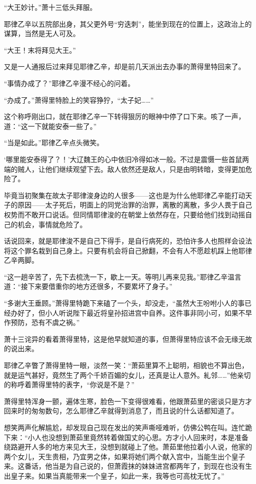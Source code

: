 “大王妙计。”萧十三低头拜服。

耶律乙辛以五院部出身，其父更外号“穷迭刺”，能坐到现在的位置上，这政治上的谋算，当然是无人可及。

“大王！末将拜见大王。”

又是一人通报后过来拜见耶律乙辛，却是前几天派出去办事的萧得里特回来了。

“事情办成了？”耶律乙辛漫不经心的问着。

“办成了。”萧得里特脸上的笑容狰狞，“太子妃……”

这个称呼刚出口，就在耶律乙辛一下转得狠厉的眼神中停了口下来。咳了一声，道：“这一下就能安泰一些了。”

“当是如此。”耶律乙辛点头微笑。

‘哪里能安泰得了？！’大辽魏王的心中依旧冷得如冰一般。不过是震慑一些首鼠两端的贼人，让他们继续观望下去。敌人依然还是敌人，只是由明转暗，变得更加危险了。

毕竟当初聚集在故太子耶律浚身边的人很多——这也是为什么他耶律乙辛能打动天子的原因——太子死后，明面上的同党治罪的治罪，离散的离散，多少人畏于自己权势而不敢开口说话。但同情耶律浚的在朝堂上依然存在，只要给他们找到动摇自己的机会，事情就危险了。

话说回来，就是耶律浚不是自己下得手，是自行病死的，恐怕许多人也照样会设法将这个罪名栽到自己身上。只要有机会将自己掀翻，不会有人不愿趁机踩上他耶律乙辛两脚。

“这一趟辛苦了，先下去梳洗一下，歇上一天。等明儿再来见我。”耶律乙辛温言道：“接下来要借重你的地方还很多，不要累坏了身子。”

“多谢大王垂顾。”萧得里特跪下来磕了一个头，却没走，“虽然大王吩咐小人的事已经办好了，但小人听说陛下最近将皇孙招进宫中自养。这件事非同小可，如果不早作预防，恐有不虞之祸。”

萧十三诧异的看着萧得里特，这是他早就知道的事，但萧得里特应该不会无缘无故的说出来。

耶律乙辛瞥了萧得里特一眼，淡然一笑：“萧茹里算不上聪明，相貌也不算出色，就是运气甚好，竟然生了两个千娇百媚的女儿，还真是让人意外。糺邻……”他亲切的称呼着萧得里特的表字，“你说是不是？”

萧得里特浑身一颤，遍体生寒，脸色一下变得很难看，他跟萧茹里的密谈只是方才回来时的匆匆数句，怎么耶律乙辛就得到消息了，而且说的什么话都知道了。

想笑两声化解尴尬，却发现自己现在发出的笑声嘶哑难听，仿佛公鸭在叫。连忙跪下来：“小人也没想到萧茹里竟然转着做国丈的心思。方才小人回来时，本是准备绕路避开人多的地方来见大王，没想到就碰上了他。萧茹里他拉着小人说，他家的两个女儿，天生贵相，乃宜男之体，如果将她们两个献入宫中，当能生出个皇子来。这番话，他当是为自己说的，但萧霞抹的妹妹进宫都两年了，到现在也没有生出皇子来。如果当真能带来一个皇子，如此一来，我等也可高枕无忧了。”

